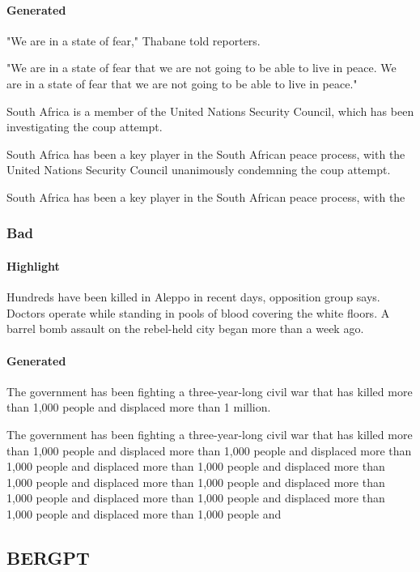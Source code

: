 \documentclass{article}
\begin{document}
\paragraph{Generated} 
"We are in a state of fear," Thabane told reporters.

"We are in a state of fear that we are not going to be able to live in peace. We are in a state of fear that we are not going to be able to live in peace."

South Africa is a member of the United Nations Security Council, which has been investigating the coup attempt.

South Africa has been a key player in the South African peace process, with the United Nations Security Council unanimously condemning the coup attempt.

South Africa has been a key player in the South African peace process, with the

\subsubsection{Bad}

\paragraph{Highlight}
Hundreds have been killed in Aleppo in recent days, opposition group says. Doctors operate while standing in pools of blood covering the white floors. A barrel bomb assault on the rebel-held city began more than a week ago.

\paragraph{Generated} 
\label{bad-dau-w}
The government has been fighting a three-year-long civil war that has killed more than 1,000 people and displaced more than 1 million.

The government has been fighting a three-year-long civil war that has killed more than 1,000 people and displaced more than 1,000 people and displaced more than 1,000 people and displaced more than 1,000 people and displaced more than 1,000 people and displaced more than 1,000 people and displaced more than 1,000 people and displaced more than 1,000 people and displaced more than 1,000 people and displaced more than 1,000 people and

\subsection{BERGPT}
\label{bergpt-w}
\end{document}
